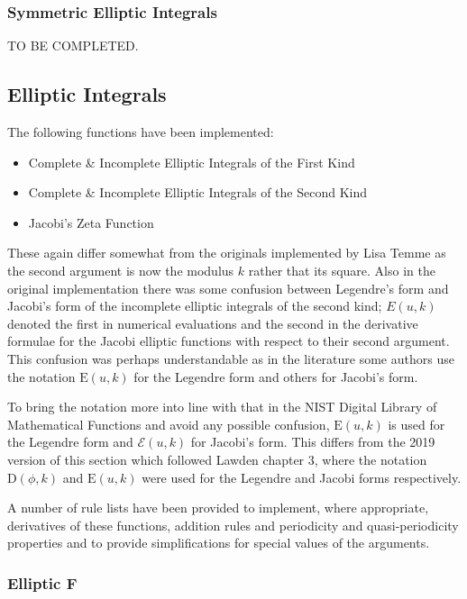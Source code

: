 \subsubsection{Symmetric Elliptic Integrals}
TO BE COMPLETED.

\subsection{Elliptic Integrals}
\hypertarget{ELLIPI}{}
The following functions have been implemented:

\begin{itemize}
\item Complete \& Incomplete Elliptic Integrals of the First Kind
\item Complete \& Incomplete Elliptic Integrals of the Second Kind
\item Jacobi's Zeta Function
\end{itemize}

These again differ somewhat from the originals implemented by Lisa Temme
as the second argument is now the modulus $k$ rather that its square.
Also in the original implementation  there was some confusion between
Legendre's form and Jacobi's form of the incomplete elliptic integrals of
the second kind; $E(u,k)$ denoted the first in numerical
evaluations and the second in the derivative formulae for the Jacobi
elliptic functions with respect to their second argument.
This confusion was perhaps understandable
as in the literature some authors use the notation $\mathrm{E}(u, k)$ for
the Legendre form and others for Jacobi's form.

To bring the notation more into line with that in the NIST Digital Library of
Mathematical Functions and avoid any possible confusion, $\mathrm{E}(u, k)$ is used for
the Legendre form and $\mathcal{E}(u, k)$ for Jacobi's form.
This differs from the 2019 version of this section which followed Lawden
\cite{Lawden:89} chapter 3, where the notation $\mathrm{D}(\phi, k)$ and
$\mathrm{E}(u, k)$ were used for the Legendre and Jacobi forms respectively.

A number of rule lists have been provided to implement, where appropriate,
derivatives of these functions, addition rules and periodicity and
quasi-periodicity properties and to provide simplifications for special values
of the arguments.

\subsubsection{Elliptic F}
\hypertarget{operator:ELLIPTICF}{}

